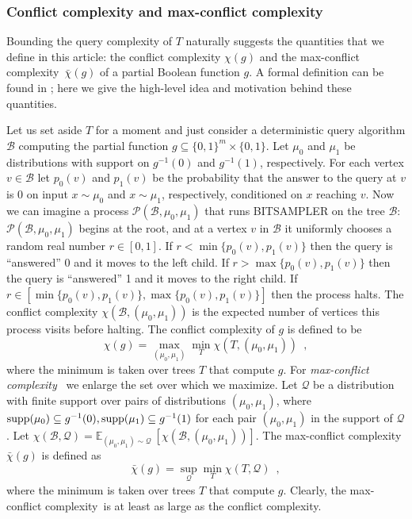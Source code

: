 \documentclass{toc}
\newcommand\supp{\mathop{\rm supp}}
\newcommand{\clB}{\mathcal{B}}
\newcommand{\clQ}{\mathcal{Q}}
\newcommand{\clP}{\mathcal{P}}
\newcommand{\E}{\mathbb{E}}
\newcommand{\ccc}{max-conflict complexity}
\begin{document}
\subsubsection{Conflict complexity and \ccc}
Bounding the query complexity of $T$ naturally suggests the quantities that we define in this %
article:  %
the conflict complexity $\chi(g)$ and the \ccc \ $\bar \chi(g)$ of a partial Boolean function $g$. A formal definition can be found in ; here we give the high-level idea and motivation behind these quantities.  

Let us set aside $T$ for a moment and just consider a deterministic query algorithm $\clB$ computing the partial function $g \subseteq \{0,1\}^m \times \{0,1\}$.  
Let $\mu_0$
and  %
$\mu_1$ be distributions with support on 
$g^{-1}(0)$
and  %
$g^{-1}(1)$, respectively.
For each vertex $v \in \clB$ let $p_0(v)$ 
%
and $p_1(v)$   %
be the probability that the answer to the query at $v$ is 0 on 
input $x \sim \mu_0$ %
%
and $x \sim \mu_1$, respectively,  %
conditioned 
on $x$ reaching $v$.  Now we can imagine a process $\clP(\clB, \mu_0, \mu_1)$ that runs BITSAMPLER on the tree $\clB$: $\clP(\clB, \mu_0, \mu_1)$ begins at the root, and at a vertex $v$ in $\clB$ it uniformly chooses a random 
real number $r \in [0,1]$.  
If $r < \min\{p_0(v), p_1(v)\}$ then the query is 
%
%
%
``answered''   %
0 and it moves to the left child.  If $r > \max\{p_0(v), p_1(v)\}$ then the
query is %
``answered''  %
1 and it moves to the right child.  If 
$r \in [\min\{p_0(v), p_1(v)\}, \max\{p_0(v), p_1(v)\}]$ then the process halts.  The conflict complexity $\chi(\clB, (\mu_0, \mu_1))$ is the expected number of vertices this process visits before halting.  The conflict complexity of $g$ 
is defined to be 
\[
\chi(g) = \max_{(\mu_0, \mu_1)} \min_{T} \chi(T, (\mu_0, \mu_1)) \enspace,
\]
where the minimum is taken over trees $T$ that compute $g$.  
For \emph{\ccc} \ we enlarge the set over which we maximize.  Let $\clQ$ be a distribution with finite support over pairs of distributions $(\mu_0, \mu_1)$, where $\supp(\mu_0) \subseteq g^{-1}(0), \supp(\mu_1) \subseteq g^{-1}(1)$ 
for each pair $(\mu_0, \mu_1)$ in the support of $\clQ$.
Let $\chi(\clB, \clQ) = \E_{(\mu_0, \mu_1) \sim \clQ}\ [ \chi(\clB, (\mu_0, \mu_1))]$.
The max-conflict complexity $\bar \chi(g)$ is defined as 
\[
\bar \chi(g) = \sup_{\clQ} \min_{T} \chi(T, \clQ) \enspace ,
\]
where the minimum is taken over trees $T$ that compute $g$.  
Clearly, the \ccc \ is at least as large as the conflict complexity.
\end{document}
